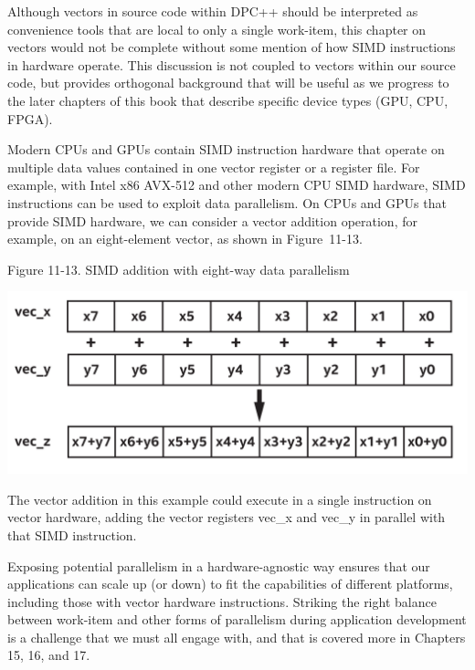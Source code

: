 Although vectors in source code within DPC++ should be interpreted as convenience tools that are local to only a single work-item, this chapter on vectors would not be complete without some mention of how SIMD instructions in hardware operate. This discussion is not coupled to vectors within our source code, but provides orthogonal background that will be useful as we progress to the later chapters of this book that describe specific device types (GPU, CPU, FPGA).\par

Modern CPUs and GPUs contain SIMD instruction hardware that operate on multiple data values contained in one vector register or a register file. For example, with Intel x86 AVX-512 and other modern CPU SIMD hardware, SIMD instructions can be used to exploit data parallelism. On CPUs and GPUs that provide SIMD hardware, we can consider a vector addition operation, for example, on an eight-element vector, as shown in Figure 11-13.\par

\hspace*{\fill} \par %
Figure 11-13. SIMD addition with eight-way data parallelism
\begin{center}
	\includegraphics[width=1.0\textwidth]{content/chapter-11/images/2}
\end{center}

The vector addition in this example could execute in a single instruction on vector hardware, adding the vector registers vec\_x and vec\_y in parallel with that SIMD instruction.\par

Exposing potential parallelism in a hardware-agnostic way ensures that our applications can scale up (or down) to fit the capabilities of different platforms, including those with vector hardware instructions. Striking the right balance between work-item and other forms of parallelism during application development is a challenge that we must all engage with, and that is covered more in Chapters 15, 16, and 17.\par













